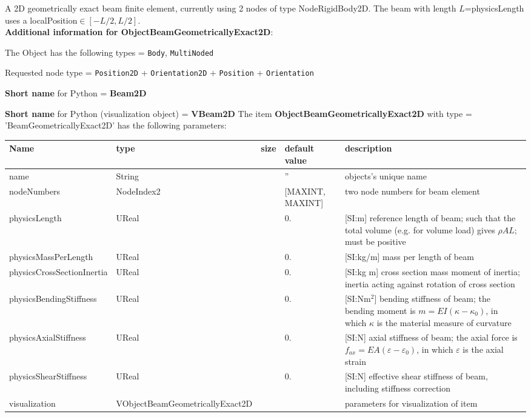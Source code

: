 \label{sec:item:ObjectBeamGeometricallyExact2D}
A 2D geometrically exact beam finite element, currently using 2 nodes of type NodeRigidBody2D. The beam with length $L$=physicsLength uses a localPosition$\in [-L/2, L/2]$.\vspace{12pt}
 \\{\bf Additional information for ObjectBeamGeometricallyExact2D}:
\bi
  \item The Object has the following types = \texttt{Body}, \texttt{MultiNoded}
  \item Requested node type = \texttt{Position2D} + \texttt{Orientation2D} + \texttt{Position} + \texttt{Orientation}
  \item {\bf Short name} for Python = {\bf Beam2D}  \item {\bf Short name} for Python (visualization object) = {\bf VBeam2D}\ei
\vspace{12pt} \noindent The item {\bf ObjectBeamGeometricallyExact2D} with type = 'BeamGeometricallyExact2D' has the following parameters:\vspace{-1cm}\\ 
\begin{center}
  \footnotesize
  \begin{longtable}{| p{4.5cm} | p{2.5cm} | p{0.5cm} | p{2.5cm} | p{6cm} |}
    \hline
    \bf Name & \bf type & \bf size & \bf default value & \bf description \\ \hline
    name &     String &      &     '' &     objects's unique name\\ \hline
    nodeNumbers &     NodeIndex2 &      &     [MAXINT, MAXINT] &     two node numbers for beam element\\ \hline
    physicsLength &     UReal &      &     0. &      [SI:m] reference length of beam; such that the total volume (e.g. for volume load) gives $\rho A L$; must be positive\\ \hline
    physicsMassPerLength &     UReal &      &     0. &      [SI:kg/m] mass per length of beam\\ \hline
    physicsCrossSectionInertia &     UReal &      &     0. &      [SI:kg m] cross section mass moment of inertia; inertia acting against rotation of cross section\\ \hline
    physicsBendingStiffness &     UReal &      &     0. &      [SI:Nm$^2$] bending stiffness of beam; the bending moment is $m = EI (\kappa - \kappa_0)$, in which $\kappa$ is the material measure of curvature\\ \hline
    physicsAxialStiffness &     UReal &      &     0. &      [SI:N] axial stiffness of beam; the axial force is $f_{ax} = EA (\varepsilon -\varepsilon_0)$, in which $\varepsilon$ is the axial strain\\ \hline
    physicsShearStiffness &     UReal &      &     0. &      [SI:N] effective shear stiffness of beam, including stiffness correction\\ \hline
    visualization & VObjectBeamGeometricallyExact2D & & & parameters for visualization of item \\ \hline
	  \end{longtable}
	\end{center}
